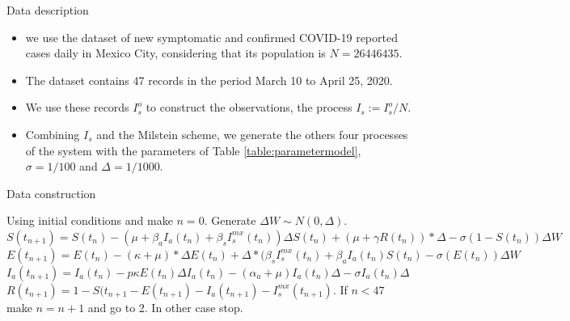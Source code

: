  \begin{frame}{Data description}
     \begin{itemize}[label=*]
        \item 
            we use the dataset of new symptomatic and 
            confirmed COVID-19 reported cases daily in Mexico City, considering 
            that its population is $N=26446435$.
        \item 
            The dataset contains 
            47 records in the period March 10 to April 25, 2020.
        \item  
            We use 
            these records $I^o_s$ to construct the observations, the process 
            $I_s:=I^o_s/N$.  
        \item  
            Combining $I_s$ and the Milstein scheme, we generate the
            others four processes of the system  with the parameters of Table
            \ref{table:parametermodel}, 
            $\sigma=1/100$ and $\Delta=1/1000$.
    \end{itemize}
\end{frame}
\begin{frame}{Data construction }
    \begin{algorithm}[H]
        \caption{Construction of dataset.} \label{Alg-ds}  
        \begin{algorithmic}[1]
            \State Using initial conditions and make $n=0$.
            \State Generate 
                $\Delta W\sim N(0,\Delta)$.
            \State 
                $
                    S(t_{n+1}) = 
                        S(t_n) - (\mu+\beta_aI_a(t_{n}) 
                        + \beta_s I_s^{mx}(t_n))\Delta S(t_{n}) 
                        + (\mu+\gamma R(t_n)) * \Delta 
                        - \sigma(1-S(t_n))\Delta W
                $
            \State 
                $
                    E(t_{n+1}) = E(t_{n}) - (\kappa+\mu) * \Delta E(t_{n}) 
                    + \Delta * (\beta_sI_s ^ {mx}(t_n) 
                    + \beta_aI_a(t_{n})S(t_n)
                    - \sigma(E(t_n))\Delta W
                $
            \State 
                $
                    I_a(t_{n+1}) = I_a(t_{n}) 
                        - p\kappa E(t_{n}) \Delta I_a(t_{n})
                        - (\alpha_a+\mu)I_a(t_{n})\Delta
                        - \sigma I_a(t_{n})\Delta
                $
            \State 
                $
                    R(t_{n+1}) = 1 - S(t_{n+1}
                        - E(t_{n+1}) - I_a(t_{n+1})
                        - I^{mx}_s(t_{n+1})
                $.
            \State If $n<47$ make $n=n+1$ and go to 2. In other case stop.
        \end{algorithmic}
    \end{algorithm}
\end{frame}
